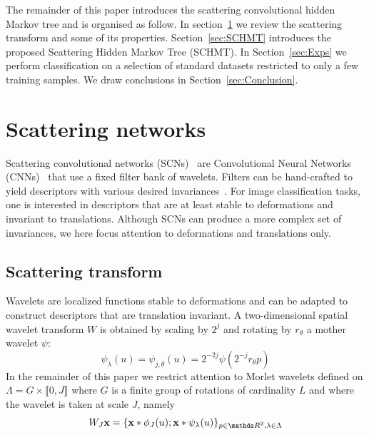 \documentclass{article}
\begin{document}
  The remainder of this paper introduces the scattering convolutional hidden Markov tree and is organised as follow. In section~\ref{sec:SCN} we review the scattering transform and some of its properties. Section~\ref{sec:SCHMT} introduces the proposed Scattering Hidden Markov Tree (SCHMT). In Section~\ref{sec:Exps} we perform classification on a selection of standard datasets restricted
  to only a few training samples. We draw conclusions in Section~\ref{sec:Conclusion}.
  
\section{Scattering networks}
  \label{sec:SCN}
  \vspace{-5pt}
  Scattering convolutional networks (SCNs)~\cite{bruna2013scattering} are Convolutional Neural Networks (CNNs)~\cite{lecun1995convolutional} that use a fixed filter bank of wavelets. Filters can be hand-crafted to yield descriptors with various desired invariances~\cite{mallat2012gis}. For image classification tasks, one is interested in descriptors that are at least stable to deformations and invariant to translations. Although SCNs can produce a more complex set of invariances, we here focus attention to deformations and translations only.

  \vspace{-5pt}
  \subsection{Scattering transform}
    \label{subsec:SCN/ST}
    \vspace{-5pt}
    Wavelets are localized functions stable to deformations and can be adapted to construct descriptors that are translation invariant. A two-dimensional spatial wavelet transform $W$ is obtained by scaling
    by $2^{j}$ and rotating by $r_{\theta}$ a mother wavelet $\psi$:
    \vspace{-5pt}
    \begin{equation}
      \label{eq:multi-scale directional wavelet}
      \psi_{\lambda}(u) = \psi_{j,\theta}(u) = 2^{-2j} \psi(2^{-j}r_{\theta}p)
    \end{equation}
    In the remainder of this paper we restrict attention to Morlet wavelets defined on $\Lambda = G \times \llbracket 0,J \rrbracket$ where $G$ is a finite group of rotations of cardinality $L$ and where the wavelet is taken at scale $J$, namely 
    \vspace{-5pt}
    \begin{equation}
      \label{eq:wavelet transform}
      W_{J}\bfx = \{ \bfx \ast \phi_{J}(u); \bfx \ast \psi_{\lambda}(u) \}_{p\in\dsR^{2},\lambda \in \Lambda}
    \end{equation}
    \vspace{-15pt}
    
\end{document}
